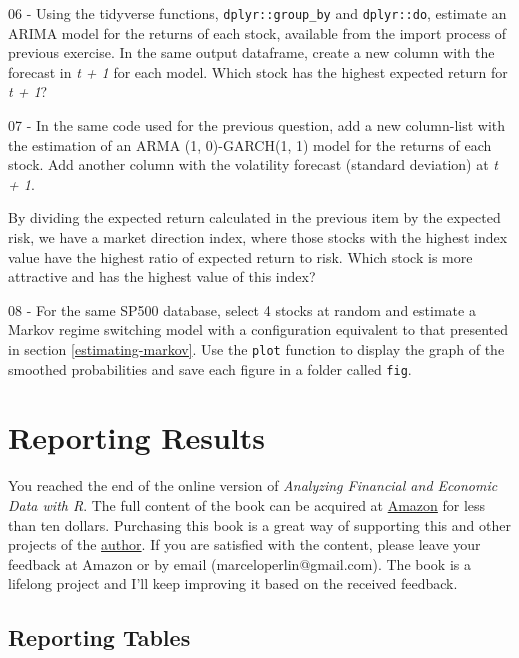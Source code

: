 \documentclass[
  12pt,
]{book}
\newenvironment{pleasebuyit}
{\begin{noteblock}
		
	} {\end{noteblock}}
\begin{document}
06 -
Using the tidyverse functions, \texttt{dplyr::group\_by} and \texttt{dplyr::do}, estimate an ARIMA model for the returns of each stock, available from the import process of previous exercise. In the same output dataframe, create a new column with the forecast in \emph{t + 1} for each model. Which stock has the highest expected return for \emph{t + 1}?

07 -
In the same code used for the previous question, add a new column-list with the estimation of an ARMA (1, 0)-GARCH(1, 1) model for the returns of each stock. Add another column with the volatility forecast (standard deviation) at \emph{t + 1}.

By dividing the expected return calculated in the previous item by the expected risk, we have a market direction index, where those stocks with the highest index value have the highest ratio of expected return to risk. Which stock is more attractive and has the highest value of this index?

08 -
For the same SP500 database, select 4 stocks at random and estimate a Markov regime switching model with a configuration equivalent to that presented in section \ref{estimating-markov}. Use the \texttt{plot} function to display the graph of the smoothed probabilities and save each figure in a folder called \texttt{\textquotesingle{}fig\textquotesingle{}}.

\hypertarget{reporting}{%
\chapter{Reporting Results}\label{reporting}}

\begin{pleasebuyit}
You reached the end of the online version of \emph{Analyzing Financial
and Economic Data with R}. The full content of the book can be acquired
at \href{https://www.amazon.com/dp/B084LSNXMN}{Amazon} for less than ten
dollars. Purchasing this book is a great way of supporting this and
other projects of the \href{https://www.msperlin.com/}{author}. If you
are satisfied with the content, please leave your feedback at Amazon or
by email (marceloperlin@gmail.com). The book is a lifelong project and
I'll keep improving it based on the received feedback.
\end{pleasebuyit}

\hypertarget{reporting-tables}{%
\section{Reporting Tables}\label{reporting-tables}}
\end{document}
